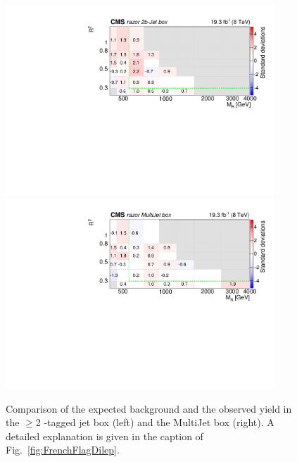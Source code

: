 \begin{figure}[tb!]
\centering
\includegraphics[width=0.9\textwidth]{figs/analysis8TeV/nSigmaLog_Jet2b.pdf}
\includegraphics[width=0.9\textwidth]{figs/analysis8TeV/nSigmaLog_MultiJetFITS.pdf}
\caption{Comparison of the expected background and the observed yield
  in the $\geq$2 \PQb-tagged jet box (left) and the MultiJet box
  (right). A detailed explanation is given in the caption of
  Fig.~\ref{fig:FrenchFlagDilep}.\label{fig:FrenchFlagHad}}

\end{figure}

